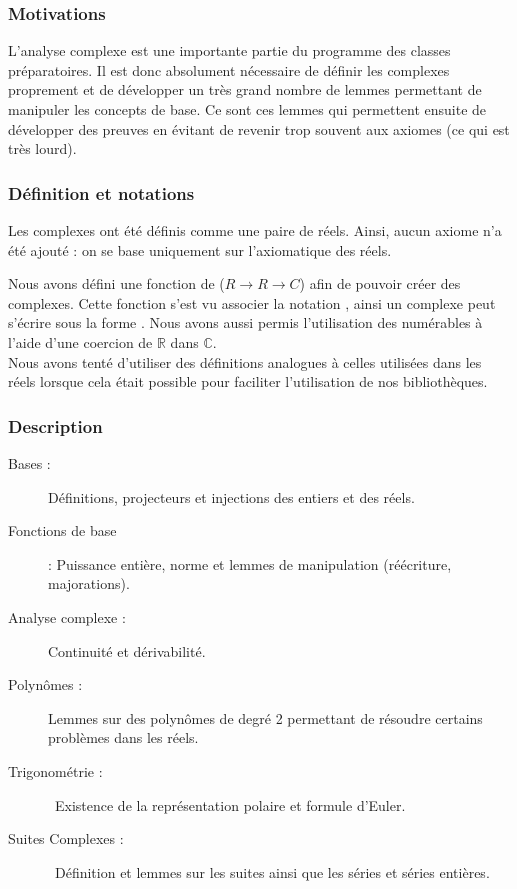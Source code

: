 \subsubsection{Motivations}

L'analyse complexe est une importante partie du programme des classes préparatoires. Il est donc absolument nécessaire de définir les complexes proprement et de développer un très grand nombre de lemmes permettant de manipuler les concepts de base. Ce sont ces lemmes qui permettent ensuite de développer des preuves en évitant de revenir trop souvent aux axiomes (ce qui est très lourd).

\subsubsection{Définition et notations}

Les complexes ont été définis comme une paire de réels. Ainsi, aucun axiome n'a été ajouté : on se base uniquement sur l'axiomatique des réels.

Nous avons défini une fonction de ($R \rightarrow R \rightarrow C$) afin de pouvoir créer des complexes. Cette fonction s'est vu associer la notation , ainsi un complexe peut s'écrire sous la forme . Nous avons aussi permis l'utilisation des numérables à l'aide d'une coercion de $\mathbb{R}$ dans $\mathbb{C}$.\\
Nous avons tenté d'utiliser des définitions analogues à celles utilisées dans les réels lorsque cela était possible pour faciliter l'utilisation de nos bibliothèques.

\subsubsection{Description}

\begin{description}
 \item [Bases :] Définitions, projecteurs et injections des entiers et des réels.
 \item [Fonctions de base] : Puissance entière, norme et lemmes de manipulation (réécriture, majorations).
 \item [Analyse complexe :] Continuité et dérivabilité.
 \item [Polynômes :] Lemmes sur des polynômes de degré 2 permettant de résoudre certains problèmes dans les réels.
 \item [Trigonométrie :] Existence de la représentation polaire et formule d'Euler.
 \item [Suites Complexes :] Définition et lemmes sur les suites ainsi que les séries et séries entières.
\end{description}

